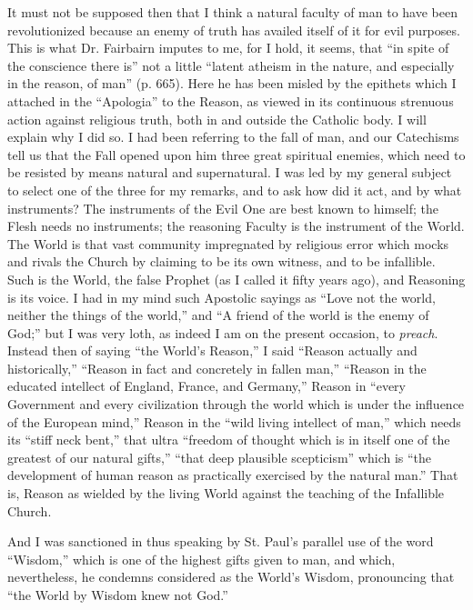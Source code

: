 It must not be supposed then that I think a natural faculty of man
to have been revolutionized because an enemy of truth has availed
itself of it for evil purposes. This is what Dr. Fairbairn imputes to
me, for I hold, it seems, that ``in spite of the conscience there
is'' not a little ``latent atheism in the nature, and
especially in the reason, of man'' (p. 665). Here he has been
misled by the epithets which I attached in the ``Apologia'' to
the Reason, as viewed in its continuous strenuous action against
religious truth, both in and outside the Catholic body. I will explain
why I did so. I had been referring to the fall of man, and our
Catechisms tell us that the Fall opened upon him three great spiritual
enemies, which need to be resisted by means natural and supernatural.
I was led by my general subject to select one of the three for my
remarks, and to ask how did it act, and by what instruments? The
instruments of the Evil One are best known to himself; the Flesh needs
no instruments; the reasoning Faculty is the instrument of the World.
The World is that vast community impregnated by religious error which
mocks and rivals the Church by claiming to be its own witness, and to
be infallible. Such is the World, the false Prophet (as I called it
fifty years ago), and Reasoning is its voice. I had in my mind such
Apostolic sayings as ``Love not the world, neither the things of
the world,'' and ``A friend of the world is the enemy of
God;'' but I was very loth, as indeed I am on the present
occasion, to \emph{preach}. Instead then of saying ``the World's
Reason,'' I said ``Reason actually and historically,''
``Reason in fact and concretely in fallen man,'' ``Reason
in the educated intellect of England, France, and Germany,''
Reason in ``every Government and every civilization through the
world which is under the influence of the European mind,'' Reason
in the ``wild living intellect of man,'' which needs its
``stiff neck bent,'' that ultra ``freedom of thought which
is in itself one of the greatest of our natural gifts,''
``that deep plausible scepticism'' which is ``the
development of human reason as practically exercised by the natural
man.'' That is, Reason as wielded by the living World against the
teaching of the Infallible Church.

And I was sanctioned in thus speaking by St. Paul's parallel use of
the word ``Wisdom,'' which is one of the highest gifts given
to man, and which, nevertheless, he condemns considered as the World's
Wisdom, pronouncing that ``the World by Wisdom knew not God.''

